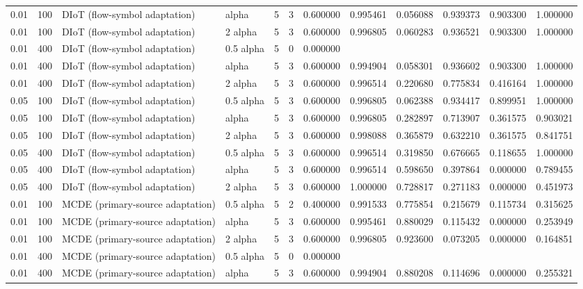 \begin{tabular}{llllllllllll}
0.01 & 100 & DIoT (flow-symbol adaptation) & alpha & 5 & 3 & 0.600000 & 0.995461 & 0.056088 & 0.939373 & 0.903300 & 1.000000 \\
0.01 & 100 & DIoT (flow-symbol adaptation) & 2 alpha & 5 & 3 & 0.600000 & 0.996805 & 0.060283 & 0.936521 & 0.903300 & 1.000000 \\
0.01 & 400 & DIoT (flow-symbol adaptation) & 0.5 alpha & 5 & 0 & 0.000000 &  &  &  &  &  \\
0.01 & 400 & DIoT (flow-symbol adaptation) & alpha & 5 & 3 & 0.600000 & 0.994904 & 0.058301 & 0.936602 & 0.903300 & 1.000000 \\
0.01 & 400 & DIoT (flow-symbol adaptation) & 2 alpha & 5 & 3 & 0.600000 & 0.996514 & 0.220680 & 0.775834 & 0.416164 & 1.000000 \\
0.05 & 100 & DIoT (flow-symbol adaptation) & 0.5 alpha & 5 & 3 & 0.600000 & 0.996805 & 0.062388 & 0.934417 & 0.899951 & 1.000000 \\
0.05 & 100 & DIoT (flow-symbol adaptation) & alpha & 5 & 3 & 0.600000 & 0.996805 & 0.282897 & 0.713907 & 0.361575 & 0.903021 \\
0.05 & 100 & DIoT (flow-symbol adaptation) & 2 alpha & 5 & 3 & 0.600000 & 0.998088 & 0.365879 & 0.632210 & 0.361575 & 0.841751 \\
0.05 & 400 & DIoT (flow-symbol adaptation) & 0.5 alpha & 5 & 3 & 0.600000 & 0.996514 & 0.319850 & 0.676665 & 0.118655 & 1.000000 \\
0.05 & 400 & DIoT (flow-symbol adaptation) & alpha & 5 & 3 & 0.600000 & 0.996514 & 0.598650 & 0.397864 & 0.000000 & 0.789455 \\
0.05 & 400 & DIoT (flow-symbol adaptation) & 2 alpha & 5 & 3 & 0.600000 & 1.000000 & 0.728817 & 0.271183 & 0.000000 & 0.451973 \\
0.01 & 100 & MCDE (primary-source adaptation) & 0.5 alpha & 5 & 2 & 0.400000 & 0.991533 & 0.775854 & 0.215679 & 0.115734 & 0.315625 \\
0.01 & 100 & MCDE (primary-source adaptation) & alpha & 5 & 3 & 0.600000 & 0.995461 & 0.880029 & 0.115432 & 0.000000 & 0.253949 \\
0.01 & 100 & MCDE (primary-source adaptation) & 2 alpha & 5 & 3 & 0.600000 & 0.996805 & 0.923600 & 0.073205 & 0.000000 & 0.164851 \\
0.01 & 400 & MCDE (primary-source adaptation) & 0.5 alpha & 5 & 0 & 0.000000 &  &  &  &  &  \\
0.01 & 400 & MCDE (primary-source adaptation) & alpha & 5 & 3 & 0.600000 & 0.994904 & 0.880208 & 0.114696 & 0.000000 & 0.255321 \\

\end{tabular}
